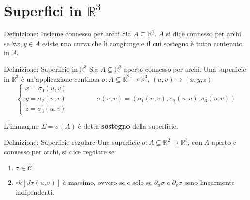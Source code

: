 \documentclass[x11names]{article}
\begin{document}
	\section{Superfici in \(\mathbb{R}^3\)}
	\begin{center}
		\colorbox{myblue}{\begin{minipage}{5.75in}
				\begin{blues}{Definizione: Insieme connesso per archi}
					Sia \(A \subseteq \mathbb{R}^2\). \(A\) si dice connesso per archi se 
					\(\forall x,y \in A \) esiste una curva che li congiunge e il cui sostegno è tutto contenuto in \(A\).
				\end{blues}
		\end{minipage}}      
	\end{center}
	\begin{center}
		\colorbox{myblue}{\begin{minipage}{5.75in}
				\begin{blues}{Definizione: Superficie in \(\mathbb{R}^3\)}
					Sia \(A \subseteq \mathbb{R}^2\) aperto connesso per archi. Una superficie in \(\mathbb{R}^3\) è un'applicazione continua \(\sigma : A \subseteq \mathbb{R}^2 \to \mathbb{R}^3\), \((u,v) \mapsto (x,y,z)\)
					\[ 
					\begin{cases}
						x = \sigma_1(u,v) \\
						y = \sigma_2(u,v) \\
						z = \sigma_3(u,v) 
					\end{cases} \qquad \qquad \sigma(u,v) = (\sigma_1(u,v),\sigma_2(u,v),\sigma_3(u,v))
					\]
					
					L'immagine \(\Sigma = \sigma(A)\) è detta \textbf{sostegno} della superficie.
				\end{blues}
		\end{minipage}}      
	\end{center}
	\begin{center}
		\colorbox{myblue}{\begin{minipage}{5.75in}
				\begin{blues}{Definizione: Superficie regolare}
					Una superficie \(\sigma: A\subseteq \mathbb{R}^2 \to \mathbb{R}^3\), con \(A\) aperto e connesso per archi, si dice regolare se
					\begin{enumerate}
						\item \(\sigma \in \mathcal{C}^1\)
						\item \(rk\left[J\sigma(u,v)\right]\) è massimo, ovvero se e solo se \(\partial_u \sigma\) e \(\partial_v \sigma\) sono linearmente indipendenti.
					\end{enumerate}
				\end{blues}
		\end{minipage}}      
	\end{center}
	
\end{document}
